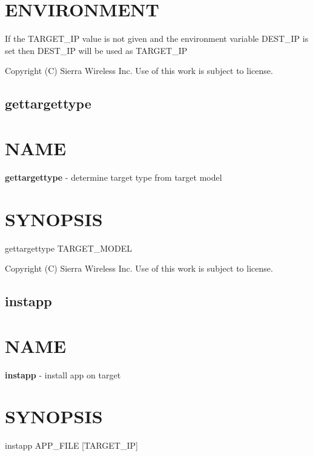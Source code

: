 \section*{E\+N\+V\+I\+R\+O\+N\+M\+E\+N\+T}

\begin{DoxyVerb}If the TARGET_IP value is not given and the environment variable DEST_IP
is set then DEST_IP will be used as TARGET_IP
\end{DoxyVerb}




 Copyright (C) Sierra Wireless Inc. Use of this work is subject to license. \hypertarget{toolsHost_gettargettype}{}\subsection{gettargettype}\label{toolsHost_gettargettype}
\section*{N\+A\+M\+E}

{\bfseries gettargettype} -\/ determine target type from target model

\section*{S\+Y\+N\+O\+P\+S\+I\+S}

{\ttfamily gettargettype T\+A\+R\+G\+E\+T\+\_\+\+M\+O\+D\+E\+L}~\newline




 Copyright (C) Sierra Wireless Inc. Use of this work is subject to license. \hypertarget{toolsHost_instapp}{}\subsection{instapp}\label{toolsHost_instapp}
\section*{N\+A\+M\+E}

{\bfseries instapp} -\/ install app on target

\section*{S\+Y\+N\+O\+P\+S\+I\+S}

{\ttfamily instapp A\+P\+P\+\_\+\+F\+I\+L\+E \mbox{[}T\+A\+R\+G\+E\+T\+\_\+\+I\+P\mbox{]}}~\newline


